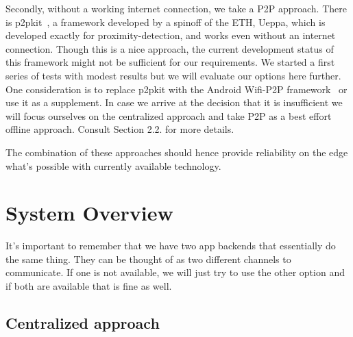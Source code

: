 \documentclass{report}
\begin{document}
Secondly, without a working internet connection, we take a P2P approach. There is p2pkit~\cite{p2pkit}, a framework developed by a spinoff of the ETH, Ueppa, which is developed exactly for proximity-detection, and works even without an internet connection. Though this is a nice approach, the current development status of this framework might not be sufficient for our requirements. We started a first series of tests with modest results but we will evaluate our options here further. One consideration is to replace p2pkit with the Android Wifi-P2P framework~\cite{android_wifi_p2p} or use it as a supplement. In case we arrive at the decision that it is insufficient we will focus ourselves on the centralized approach and take P2P as a best effort offline approach. Consult Section 2.2. for more details.

The combination of these approaches should hence provide reliability on the edge what’s possible with currently available technology.

\section{System Overview}

It's important to remember that we have two app backends that essentially do the same thing. They can be thought of as two different channels to communicate. If one is not available, we will just try to use the other option and if both are available that is fine as well.

\subsection{Centralized approach}
\end{document}

